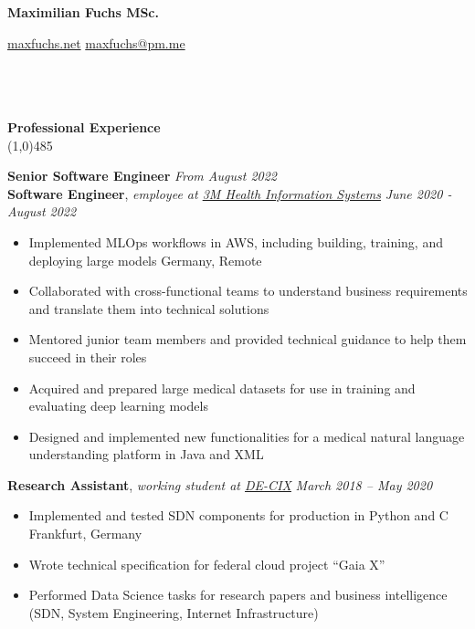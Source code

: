 \documentclass[9pt]{extarticle}
\newcommand\negativespace[1][-0.12cm]{\hspace*{#1}}
\begin{document}
\centerline{{\LARGE \bf Maximilian Fuchs MSc.}}
\centerline{\small \href{https://maxfuchs.net}{maxfuchs.net} \raisebox{0.25ex}{\tiny$\bullet$}  \href{mailto:maxfuchs@pm.me}{maxfuchs@pm.me}}


\noindent %
\\\\\\
\vspace*{-6pt}
{\negativespace \Large \bf Professional Experience}\\
\line(1,0){485}
\\
\noindent

\noindent
{\bf Senior Software Engineer}  \hfill \textit{From August 2022} \\
{\bf Software Engineer}, \textit{employee at \href{https://www.3m.com/3M/en_US/health-information-systems-us/support/international/}{3M Health Information Systems}}  \hfill \textit{June 2020 - August 2022} 
\begin{itemize}
\setlength\itemsep{0.05em}
\item Implemented MLOps workflows in AWS, including building, training, and deploying large models  \hfill Germany, Remote \\ 
\item Collaborated with cross-functional teams to understand business requirements and translate them into technical solutions 
\item Mentored junior team members and provided technical guidance to help them succeed in their roles 
\item Acquired and prepared large medical datasets for use in training and evaluating deep learning models 
\item Designed and implemented new functionalities for a medical natural language understanding platform in Java and XML \\
\end{itemize}

\noindent
{\bf Research Assistant}, \textit{working student at \href{https://www.de-cix.net/}{DE-CIX}}   \hfill \textit{March 2018 -- May 2020}
\begin{itemize}
\setlength\itemsep{0.05em}
\item Implemented and tested SDN components for production in Python and C \hfill Frankfurt, Germany \\
\item Wrote technical specification for federal cloud project “Gaia X”
\item Performed Data Science tasks for research papers and business intelligence \\
(SDN, System Engineering, Internet Infrastructure) \\
\end{itemize}
\end{document}
